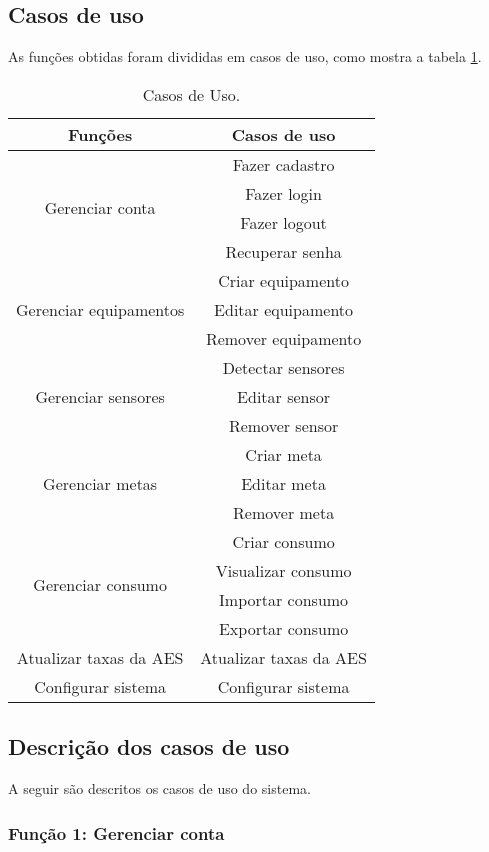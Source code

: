 \subsection{Casos de uso}
As funções obtidas foram divididas em casos de uso, como mostra a tabela \ref{tab:casos_de_uso}.
%
\begin{table}[H]
\centering
{\renewcommand{\arraystretch}{1.5}
\renewcommand{\tabcolsep}{0.2cm}
\begin{tabular}{|c|c|}
\hline
\textbf{Funções} & \textbf{Casos de uso} \\
\hline
\multirow{4}{*}{Gerenciar conta} & Fazer cadastro\\
& Fazer login\\
& Fazer logout\\
& Recuperar senha\\
\hline
\multirow{3}{*}{Gerenciar equipamentos} & Criar equipamento\\
& Editar equipamento\\
& Remover equipamento\\
\hline
\multirow{3}{*}{Gerenciar sensores} & Detectar sensores\\
& Editar sensor\\
& Remover sensor\\
\hline
\multirow{3}{*}{Gerenciar metas} & Criar meta\\
& Editar meta\\
& Remover meta\\
\hline
\multirow{4}{*}{Gerenciar consumo} & Criar consumo\\
& Visualizar consumo\\
& Importar consumo\\
& Exportar consumo\\
\hline
Atualizar taxas da AES & Atualizar taxas da AES\\
\hline
Configurar sistema & Configurar sistema\\
\hline
\end{tabular}}
\caption{\label{tab:casos_de_uso} Casos de Uso.}
\end{table}
%
\subsection{Descrição dos casos de uso}
A seguir são descritos os casos de uso do sistema. 
%
\subsubsection{Função 1: Gerenciar conta}

